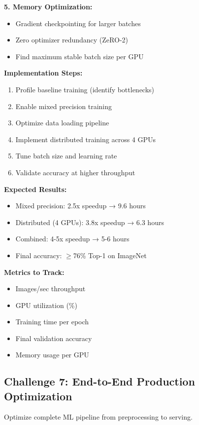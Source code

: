 \textbf{5. Memory Optimization:}
\begin{itemize}
    \item Gradient checkpointing for larger batches
    \item Zero optimizer redundancy (ZeRO-2)
    \item Find maximum stable batch size per GPU
\end{itemize}

\textbf{Implementation Steps:}
\begin{enumerate}
    \item Profile baseline training (identify bottlenecks)
    \item Enable mixed precision training
    \item Optimize data loading pipeline
    \item Implement distributed training across 4 GPUs
    \item Tune batch size and learning rate
    \item Validate accuracy at higher throughput
\end{enumerate}

\textbf{Expected Results:}
\begin{itemize}
    \item Mixed precision: 2.5x speedup → 9.6 hours
    \item Distributed (4 GPUs): 3.8x speedup → 6.3 hours
    \item Combined: 4-5x speedup → 5-6 hours
    \item Final accuracy: $\geq$76\% Top-1 on ImageNet
\end{itemize}

\textbf{Metrics to Track:}
\begin{itemize}
    \item Images/sec throughput
    \item GPU utilization (\%)
    \item Training time per epoch
    \item Final validation accuracy
    \item Memory usage per GPU
\end{itemize}

\subsection{Challenge 7: End-to-End Production Optimization}

Optimize complete ML pipeline from preprocessing to serving.

